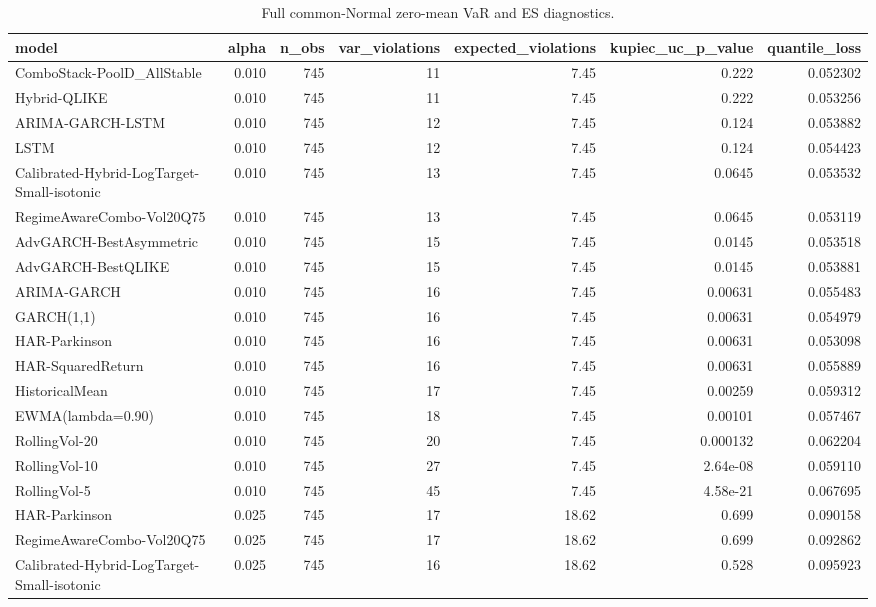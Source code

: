 \begin{table}[!t]
\centering
\caption{Full common-Normal zero-mean VaR and ES diagnostics.}
\label{tab:common-distribution-var-es-full}
\scriptsize
\begin{tabular}{@{}lrrrrrr@{}}
\toprule
model & alpha & n\_obs & var\_violations & expected\_violations & kupiec\_uc\_p\_value & quantile\_loss \\
\midrule
ComboStack-PoolD\_AllStable & 0.010 & 745 & 11 & 7.45 & 0.222 & 0.052302 \\
Hybrid-QLIKE & 0.010 & 745 & 11 & 7.45 & 0.222 & 0.053256 \\
ARIMA-GARCH-LSTM & 0.010 & 745 & 12 & 7.45 & 0.124 & 0.053882 \\
LSTM & 0.010 & 745 & 12 & 7.45 & 0.124 & 0.054423 \\
Calibrated-Hybrid-LogTarget-Small-isotonic & 0.010 & 745 & 13 & 7.45 & 0.0645 & 0.053532 \\
RegimeAwareCombo-Vol20Q75 & 0.010 & 745 & 13 & 7.45 & 0.0645 & 0.053119 \\
AdvGARCH-BestAsymmetric & 0.010 & 745 & 15 & 7.45 & 0.0145 & 0.053518 \\
AdvGARCH-BestQLIKE & 0.010 & 745 & 15 & 7.45 & 0.0145 & 0.053881 \\
ARIMA-GARCH & 0.010 & 745 & 16 & 7.45 & 0.00631 & 0.055483 \\
GARCH(1,1) & 0.010 & 745 & 16 & 7.45 & 0.00631 & 0.054979 \\
HAR-Parkinson & 0.010 & 745 & 16 & 7.45 & 0.00631 & 0.053098 \\
HAR-SquaredReturn & 0.010 & 745 & 16 & 7.45 & 0.00631 & 0.055889 \\
HistoricalMean & 0.010 & 745 & 17 & 7.45 & 0.00259 & 0.059312 \\
EWMA(lambda=0.90) & 0.010 & 745 & 18 & 7.45 & 0.00101 & 0.057467 \\
RollingVol-20 & 0.010 & 745 & 20 & 7.45 & 0.000132 & 0.062204 \\
RollingVol-10 & 0.010 & 745 & 27 & 7.45 & 2.64e-08 & 0.059110 \\
RollingVol-5 & 0.010 & 745 & 45 & 7.45 & 4.58e-21 & 0.067695 \\
HAR-Parkinson & 0.025 & 745 & 17 & 18.62 & 0.699 & 0.090158 \\
RegimeAwareCombo-Vol20Q75 & 0.025 & 745 & 17 & 18.62 & 0.699 & 0.092862 \\
Calibrated-Hybrid-LogTarget-Small-isotonic & 0.025 & 745 & 16 & 18.62 & 0.528 & 0.095923 \\

\end{tabular}
\end{table}
